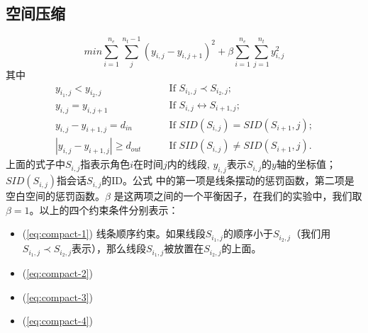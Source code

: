 \subsection{空间压缩} 
\begin{equation}
min \sum_{i=1}^{n_e} \sum_j^{n_t-1} \left(y_{i,j} - y_{i, j+1} \right)^2 + \beta \sum_{i=1}^{n_e} \sum_{j=1}^{n_t} y_{i,j}^2
\end{equation}
\label{eq:compact}
其中
\begin{subequations}
\begin{align}
	y_{i_1,j} < y_{i_2, j} & \qquad \text{If  } S_{i_1,j} \prec S_{i_2,j}; \label{eq:compact-1}\\
	y_{i,j} = y_{i,j+1} & \qquad \text{If  } S_{i,j} \leftrightarrow S_{i+1, j}; \label{eq:compact-2}\\
	y_{i,j} - y_{i+1,j} = d_{in} & \qquad \text{If  } SID(S_{i,j}) = SID(S_{i+1}, j); \label{eq:compact-3}\\
	\left|y_{i,j} - y_{i+1,j}\right| \geq d_{out} & \qquad \text{If  } SID(S_{i,j}) \neq SID(S_{i+1}, j). \label{eq:compact-4}
\end{align}
\end{subequations}
上面的式子中$S_{i,j}$指表示角色$i$在时间$j$内的线段, $y_{i,j}$表示$S_{i,j}$的$y$轴的坐标值；$SID(S_{i,j})$指会话$S_{i,j}$的ID。公式 \label{eq:compact} 中的第一项是线条摆动的惩罚函数，第二项是空白空间的惩罚函数。$\beta$ 是这两项之间的一个平衡因子，在我们的实验中，我们取 $\beta = 1$。以上的四个约束条件分别表示：
\begin{itemize}
\item (\ref{eq:compact-1}) 线条顺序约束。如果线段$S_{i_1,j}$的顺序小于$S_{i_2,j}$（我们用$S_{i_1,j} \prec S_{i_2,j}$表示），那么线段$S_{i_1,j}$被放置在$S_{i_2,j}$的上面。
\item (\ref{eq:compact-2})
\item (\ref{eq:compact-3})
\item (\ref{eq:compact-4})
\end{itemize}








